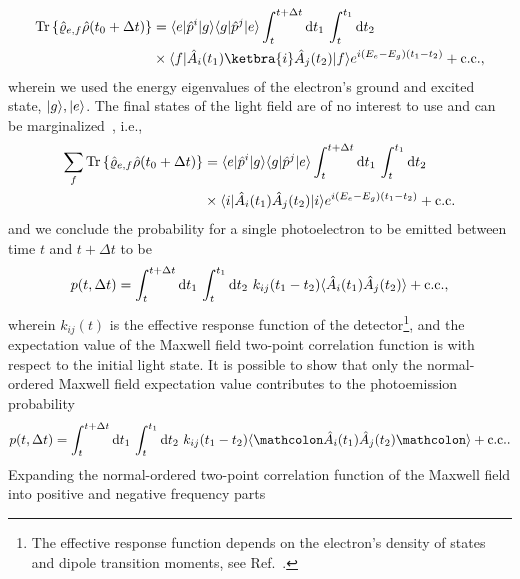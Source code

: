\begin{equation}
	\begin{split}
		\trace\left\{
			\hat\varrho_{e,f}
			\hat\rho(t_0+\Delta t)
		\right\}
		&=
		\bra{e}\hat{p}^i\ket{g}
		\bra{g}\hat{p}^j\ket{e}
		\int_t^{t+\Delta t}\dd{t_1}
		\int_t^{t_1}
		\dd{t_2}
		\\
		&\times
		\bra{f}
			\hat{A}_i(t_1)
			\ketbra{i}
			\hat{A}_j(t_2)
		\ket{f}
		e^{i(E_e-E_g)(t_1-t_2)}
		+
		\text{c.c.}
		,
	\end{split}	
\end{equation}
wherein we used the energy eigenvalues of the electron's ground and excited state, $\lvert g\rangle,\lvert e\rangle$.
The final states of the light field are of no interest to use and can be marginalized~\cite[p.~694]{Mandel1995}, i.e.,
\begin{equation}
	\begin{split}
		\sum_f
		\trace\left\{
			\hat\varrho_{e,f}
			\hat\rho(t_0+\Delta t)
		\right\}
		&=
		\bra{e}\hat{p}^i\ket{g}
		\bra{g}\hat{p}^j\ket{e}
		\int_t^{t+\Delta t}\dd{t_1}
		\int_t^{t_1}
		\dd{t_2}
		\\
		&\times
		\bra{i}
			\hat{A}_i(t_1)
			\hat{A}_j(t_2)
		\ket{i}
		e^{i(E_e-E_g)(t_1-t_2)}
		+
		\text{c.c.}
	\end{split}	
\end{equation}
and we conclude the probability for a single photoelectron to be emitted between time $t$ and $t+\Delta t$ to be
\begin{equation}
	p(t,\Delta t)
	=
	\int_t^{t+\Delta t}\dd{t_1}
	\int_t^{t_1}
	\dd{t_2}
	k_{ij}(t_1-t_2)
	\expval{
		\hat{A}_i(t_1)
		\hat{A}_j(t_2)
	}
	+
	\text{c.c.}
	,
\end{equation}
wherein $k_{ij}(t)$ is the effective response function of the detector\footnote{The effective response function depends on the electron's density of states and dipole transition moments, see Ref.~\cite[p.~694]{Mandel1995}.}, and the expectation value of the Maxwell field two-point correlation function is with respect to the initial light state.
It is possible to show that only the normal-ordered Maxwell field expectation value contributes to the photoemission probability~\cite[p.~696]{Mandel1995}
\begin{equation}
	p(t,\Delta t)
	=
	\int_t^{t+\Delta t}\dd{t_1}
	\int_t^{t_1}
	\dd{t_2}
	k_{ij}(t_1-t_2)
	\expval{
		\norder{
			\hat{A}_i(t_1)
			\hat{A}_j(t_2)
		}
	}
	+
	\text{c.c.}
	.	
\end{equation}
Expanding the normal-ordered two-point correlation function of the Maxwell field into positive and negative frequency parts
